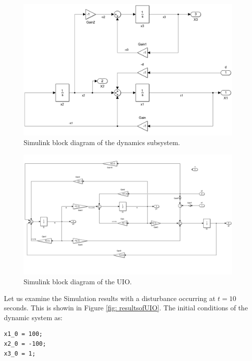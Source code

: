 \documentclass{amsart}
\theoremstyle{definition}
\theoremstyle{remark}
\numberwithin{equation}{section}
\begin{document}
\begin{figure}[h]
    \centering
    \includegraphics[scale=0.45]{dynamics.png}
    \caption{Simulink block diagram of the dynamics subsystem.}
    \label{fig:dynamics}
\end{figure}
\begin{figure}[h]
    \centering
    \includegraphics[scale=.45]{UIO.png}
    \caption{Simulink block diagram of the UIO.}
    \label{fig:UIO}
\end{figure}
Let us examine the Simulation results with a disturbance occurring at $t=10$ seconds. This is showin in Figure \ref{fig: resultsofUIO}. The initial conditions of the dynamic system as:
\begin{verbatim}
x1_0 = 100;
x2_0 = -100;
x3_0 = 1;
\end{verbatim}
\end{document}
